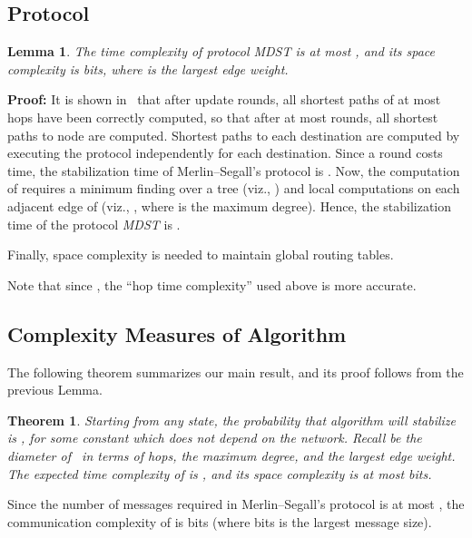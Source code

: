 \documentclass[10pt]{article}
\newtheorem{thm}{Theorem}[section]
\newtheorem{lemm}{Lemma}[section]
\newenvironment{proof}{\begin{trivlist}
                       \item[]\hspace{0cm}\textbf{Proof: }
                       \hspace{0cm} }{\hfill 
                       \end{trivlist}}
\begin{document}
\subsection{Protocol }\label{mdstcomp}

\begin{lemm}\label{lem:mdstc}
The time complexity of protocol MDST is at most
, and its space complexity is
 bits, where  is the largest edge weight.
\end{lemm}

\begin{proof}
It is shown in~\cite{MeSe79} that after  update
rounds, all shortest paths of at most  hops have been correctly
computed, so that after at most  rounds, all shortest paths to
node  are computed.  Shortest paths to each destination are
computed by executing the protocol independently for each destination.
Since a round costs  time, the stabilization time of
Merlin--Segall's protocol is .  Now, the computation of
 requires a minimum finding over a tree (viz., ) and
local computations on each adjacent edge of  (viz., ,
where  is the maximum degree). Hence, the stabilization time
of the protocol {\em MDST} is .

Finally,  space complexity is needed to maintain
global routing tables.
\end{proof}
Note that since , the ``hop time complexity''
used above is more accurate.

\subsection{Complexity Measures of Algorithm }

The following theorem summarizes our main result, and its proof follows from
the previous Lemma.

\begin{thm}\label{thm:complex}
Starting from any state, the probability that algorithm  will
stabilize is , for some constant  which
does not depend on the network. Recall  be the diameter
of~ in terms of hops,  the maximum degree, and  the
largest edge weight. The expected time complexity of  is
, and its space complexity is
at most  bits.
\end{thm}

Since the number of messages required in Merlin--Segall's protocol is
at most , the communication complexity of  is
 bits (where  bits is the largest
message size).
\end{document}
